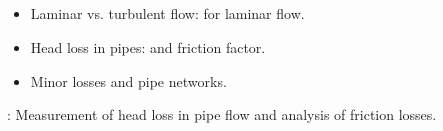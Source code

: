 \documentclass[letterpaper,10pt,english]{jupyterBook}
\begin{document}
\subsection{}
\label{\detokenize{syllabus:weeks-13-14-viscous-flow-and-internal-flow-in-pipes}}\begin{itemize}
\item {} 
\sphinxAtStartPar
Laminar vs. turbulent flow:  for laminar flow.

\item {} 
\sphinxAtStartPar
Head loss in pipes:  and friction factor.

\item {} 
\sphinxAtStartPar
Minor losses and pipe networks.

\end{itemize}

\sphinxAtStartPar
{}: Measurement of head loss in pipe flow and analysis of friction losses.
\end{document}
